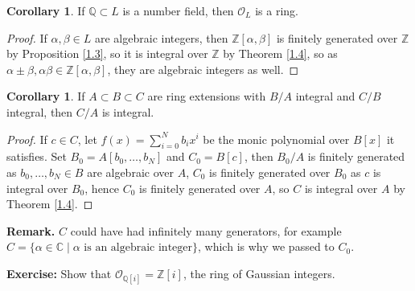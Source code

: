 \documentclass{article}
\theoremstyle{definition}
\newtheorem{cor}[theorem]{Corollary}
\begin{document}
\begin{cor}
    If $\mathbb{Q} \subset L$ is a number field, then $\mathcal{O}_L$ is a ring.
\end{cor}
\begin{proof}
    If $\alpha,\beta \in L$ are algebraic integers, then $\mathbb{Z}[\alpha,\beta]$ is finitely generated over $\mathbb{Z}$ by Proposition \ref{1.3}, so it is integral over $\mathbb{Z}$ by Theorem \ref{1.4}, so as $\alpha \pm \beta, \alpha \beta \in \mathbb{Z}[\alpha,\beta]$, they are algebraic integers as well.
\end{proof}
\begin{cor}
    If $A \subset B \subset C$ are ring extensions with $B/A$ integral and $C/B$ integral, then $C/A$ is integral.
\end{cor}
\begin{proof}
    If $c \in C$, let $f(x)=\sum_{i=0}^{N} b_i x^i$ be the monic polynomial over $B[x]$ it satisfies. Set $B_0 = A[b_0,\ldots,b_{N}]$ and $C_0=B[c]$, then $B_0/A$ is finitely generated as $b_0,\ldots,b_N \in B$ are algebraic over $A$, $C_0$ is finitely generated over $B_0$ as $c$ is integral over $B_0$, hence $C_0$ is finitely generated over $A$, so $C$ is integral over $A$ by Theorem \ref{1.4}.
\end{proof}
\textbf{Remark.} $C$ could have had infinitely many generators, for example $C = \{\alpha \in \mathbb{C} \mid \alpha \text{ is an algebraic integer}\}$, which is why we passed to $C_0$.
\vspace{1mm}

\textbf{Exercise:} Show that $\mathcal{O}_{\mathbb{Q}[i]}=\mathbb{Z}[i]$, the ring of Gaussian integers.
\vspace{1mm}
\end{document}
